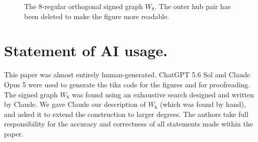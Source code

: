 \documentclass[11pt]{article}
\theoremstyle{plain}
\theoremstyle{definition}
\begin{document}
\begin{figure}
\begin{center}
\end{center}
    \caption{The 8-regular orthogonal signed graph $W_8$. The outer hub pair has been deleted to make the figure more readable.}
    \label{fig:W8}
\end{figure}


\section*{Statement of AI usage.} This paper was almost entirely human-generated. ChatGPT 5.6 Sol and Claude Opus 5 were used to generate the tikz code for the figures and for proofreading. The signed graph $W_8$ was found using an exhaustive search designed and written by Claude. We gave Claude our description of $W_6$ (which was found by hand), and asked it to extend the construction to larger degrees. The authors take full responsibility for the accuracy and correctness of all statements made within the paper. 



\end{document}

